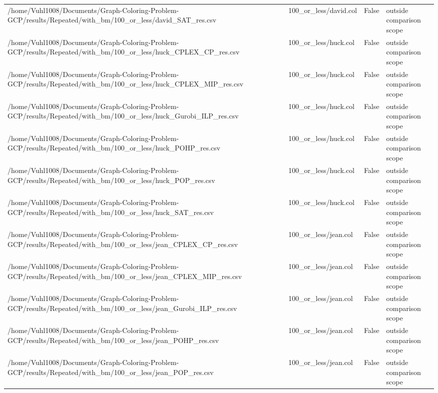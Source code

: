 \begin{table}[htbp]
\begin{tabular}{llll}
/home/Vuhl1008/Documents/Graph-Coloring-Problem-GCP/results/Repeated/with\_bm/100\_or\_less/david\_SAT\_res.csv & 100\_or\_less/david.col & False & outside comparison scope \\
/home/Vuhl1008/Documents/Graph-Coloring-Problem-GCP/results/Repeated/with\_bm/100\_or\_less/huck\_CPLEX\_CP\_res.csv & 100\_or\_less/huck.col & False & outside comparison scope \\
/home/Vuhl1008/Documents/Graph-Coloring-Problem-GCP/results/Repeated/with\_bm/100\_or\_less/huck\_CPLEX\_MIP\_res.csv & 100\_or\_less/huck.col & False & outside comparison scope \\
/home/Vuhl1008/Documents/Graph-Coloring-Problem-GCP/results/Repeated/with\_bm/100\_or\_less/huck\_Gurobi\_ILP\_res.csv & 100\_or\_less/huck.col & False & outside comparison scope \\
/home/Vuhl1008/Documents/Graph-Coloring-Problem-GCP/results/Repeated/with\_bm/100\_or\_less/huck\_POHP\_res.csv & 100\_or\_less/huck.col & False & outside comparison scope \\
/home/Vuhl1008/Documents/Graph-Coloring-Problem-GCP/results/Repeated/with\_bm/100\_or\_less/huck\_POP\_res.csv & 100\_or\_less/huck.col & False & outside comparison scope \\
/home/Vuhl1008/Documents/Graph-Coloring-Problem-GCP/results/Repeated/with\_bm/100\_or\_less/huck\_SAT\_res.csv & 100\_or\_less/huck.col & False & outside comparison scope \\
/home/Vuhl1008/Documents/Graph-Coloring-Problem-GCP/results/Repeated/with\_bm/100\_or\_less/jean\_CPLEX\_CP\_res.csv & 100\_or\_less/jean.col & False & outside comparison scope \\
/home/Vuhl1008/Documents/Graph-Coloring-Problem-GCP/results/Repeated/with\_bm/100\_or\_less/jean\_CPLEX\_MIP\_res.csv & 100\_or\_less/jean.col & False & outside comparison scope \\
/home/Vuhl1008/Documents/Graph-Coloring-Problem-GCP/results/Repeated/with\_bm/100\_or\_less/jean\_Gurobi\_ILP\_res.csv & 100\_or\_less/jean.col & False & outside comparison scope \\
/home/Vuhl1008/Documents/Graph-Coloring-Problem-GCP/results/Repeated/with\_bm/100\_or\_less/jean\_POHP\_res.csv & 100\_or\_less/jean.col & False & outside comparison scope \\
/home/Vuhl1008/Documents/Graph-Coloring-Problem-GCP/results/Repeated/with\_bm/100\_or\_less/jean\_POP\_res.csv & 100\_or\_less/jean.col & False & outside comparison scope \\

\end{tabular}
\end{table}
